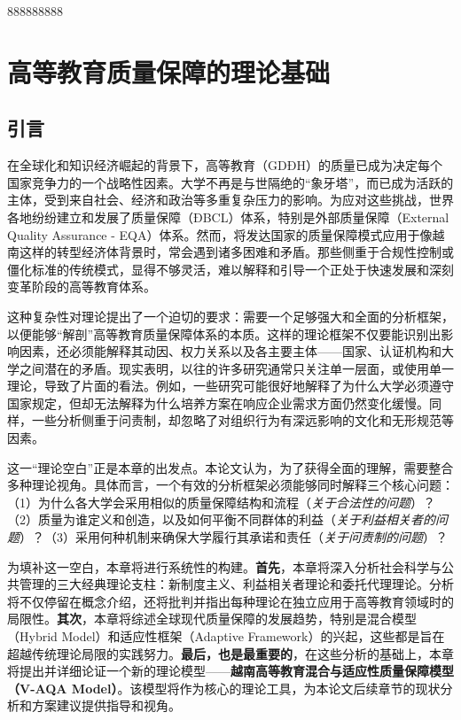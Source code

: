 888888888
\chapter{高等教育质量保障的理论基础}
\label{chap:ly_luan}

\section*{引言}

在全球化和知识经济崛起的背景下，高等教育（GDĐH）的质量已成为决定每个国家竞争力的一个战略性因素。大学不再是与世隔绝的“象牙塔”，而已成为活跃的主体，受到来自社会、经济和政治等多重复杂压力的影响。为应对这些挑战，世界各地纷纷建立和发展了质量保障（ĐBCL）体系，特别是外部质量保障（External Quality Assurance - EQA）体系。然而，将发达国家的质量保障模式应用于像越南这样的转型经济体背景时，常会遇到诸多困难和矛盾。那些侧重于合规性控制或僵化标准的传统模式，显得不够灵活，难以解释和引导一个正处于快速发展和深刻变革阶段的高等教育体系。

这种复杂性对理论提出了一个迫切的要求：需要一个足够强大和全面的分析框架，以便能够“解剖”高等教育质量保障体系的本质。这样的理论框架不仅要能识别出影响因素，还必须能解释其动因、权力关系以及各主要主体——国家、认证机构和大学之间潜在的矛盾。现实表明，以往的许多研究通常只关注单一层面，或使用单一理论，导致了片面的看法。例如，一些研究可能很好地解释了为什么大学必须遵守国家规定，但却无法解释为什么培养方案在响应企业需求方面仍然变化缓慢。同样，一些分析侧重于问责制，却忽略了对组织行为有深远影响的文化和无形规范等因素。

这一“理论空白”正是本章的出发点。本论文认为，为了获得全面的理解，需要整合多种理论视角。具体而言，一个有效的分析框架必须能够同时解释三个核心问题：（1）为什么各大学会采用相似的质量保障结构和流程（\textit{关于合法性的问题}）？（2）质量为谁定义和创造，以及如何平衡不同群体的利益（\textit{关于利益相关者的问题}）？（3）采用何种机制来确保大学履行其承诺和责任（\textit{关于问责制的问题}）？

为填补这一空白，本章将进行系统性的构建。\textbf{首先}，本章将深入分析社会科学与公共管理的三大经典理论支柱：新制度主义、利益相关者理论和委托代理理论。分析将不仅停留在概念介绍，还将批判并指出每种理论在独立应用于高等教育领域时的局限性。\textbf{其次}，本章将综述全球现代质量保障的发展趋势，特别是混合模型（Hybrid Model）和适应性框架（Adaptive Framework）的兴起，这些都是旨在超越传统理论局限的实践努力。\textbf{最后，也是最重要的}，在这些分析的基础上，本章将提出并详细论证一个新的理论模型——\textbf{越南高等教育混合与适应性质量保障模型（V-AQA Model）}。该模型将作为核心的理论工具，为本论文后续章节的现状分析和方案建议提供指导和视角。


